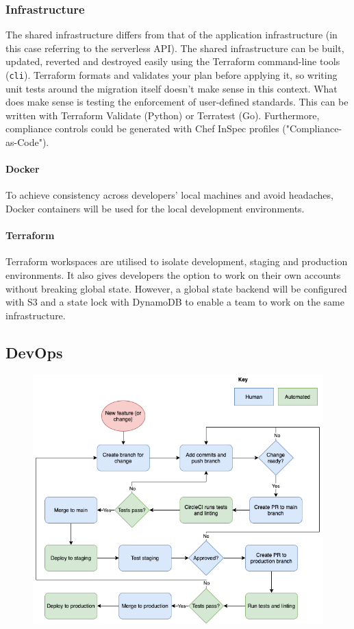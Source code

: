 \documentclass[10pt]{article}
\begin{document}
\subsubsection{Infrastructure}
The shared infrastructure differs from that of the application infrastructure (in this case referring to the serverless API). The shared infrastructure can be built, updated, reverted and destroyed easily using the Terraform command-line tools (\texttt{cli}). Terraform formats and validates your plan before applying it, so writing unit tests around the migration itself doesn't make sense in this context. What does make sense is testing the enforcement of user-defined standards. This can be written with Terraform Validate (Python) or Terratest (Go). Furthermore, compliance controls could be generated with Chef InSpec profiles ("Compliance-as-Code").

\paragraph{Docker}
To achieve consistency across developers' local machines and avoid headaches, Docker containers will be used for the local development environments.

\paragraph{Terraform}
Terraform workspaces are utilised to isolate development, staging and production environments. It also gives developers the option to work on their own accounts without breaking global state. However, a global state backend will be configured with S3 and a state lock with DynamoDB to enable a team to work on the same infrastructure.

\newpage
\subsection{DevOps}
\begin{figure}[h!]
	\centering
	\includegraphics[width=0.9\linewidth]{images/DevOpsWorkflow.png}	
\end{figure}
\end{document}
